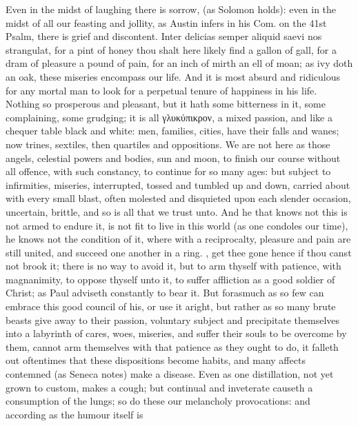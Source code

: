 {Even in the midst of laughing there is sorrow, (as Solomon holds):
even in the midst of all our feasting and jollity, as Austin
infers in his Com. on the 41st Psalm, there is grief and discontent.
Inter delicias semper aliquid saevi nos strangulat, for a pint of honey
thou shalt here likely find a gallon of gall, for a dram of pleasure a
pound of pain, for an inch of mirth an ell of moan; as ivy doth an oak,
these miseries encompass our life. And it is most absurd and ridiculous
for any mortal man to look for a perpetual tenure of happiness in his
life. Nothing so prosperous and pleasant, but it hath some
bitterness in it, some complaining, some grudging; it is all
γλυκύπικρον, a mixed passion, and like a chequer table black and white:
men, families, cities, have their falls and wanes; now trines,
sextiles, then quartiles and oppositions. We are not here as those
angels, celestial powers and bodies, sun and moon, to finish our course
without all offence, with such constancy, to continue for so many ages:
but subject to infirmities, miseries, interrupted, tossed and tumbled
up and down, carried about with every small blast, often molested and
disquieted upon each slender occasion, uncertain, brittle, and so
is all that we trust unto.  And he that knows not this is not
armed to endure it, is not fit to live in this world (as one condoles
our time), he knows not the condition of it, where with a reciprocalty,
pleasure and pain are still united, and succeed one another in a ring.
, get thee gone hence if thou canst not brook it; there is
no way to avoid it, but to arm thyself with patience, with magnanimity,
to oppose thyself unto it, to suffer affliction as a good soldier
of Christ; as Paul adviseth constantly to bear it. But forasmuch
as so few can embrace this good council of his, or use it aright, but
rather as so many brute beasts give away to their passion, voluntary
subject and precipitate themselves into a labyrinth of cares, woes,
miseries, and suffer their souls to be overcome by them, cannot arm
themselves with that patience as they ought to do, it falleth out
oftentimes that these dispositions become habits, and many affects
contemned (as Seneca notes) make a disease. Even as one
distillation, not yet grown to custom, makes a cough; but continual and
inveterate causeth a consumption of the lungs; so do these our
melancholy provocations: and according as the humour itself is
}
